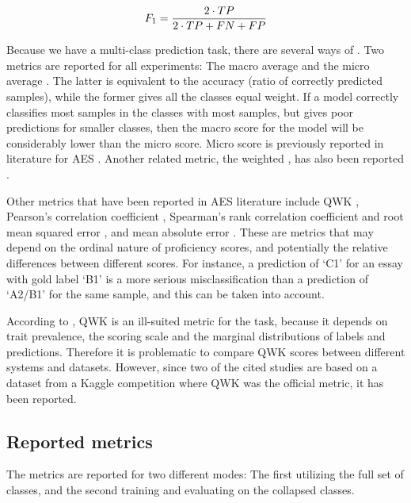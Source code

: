 \begin{equation}\label{eq:fi}
  F_1 = {{2\cdot TP}\over{2\cdot TP + FN + FP}}
\end{equation}

Because we have a multi-class prediction task, there are several
ways of . Two metrics are
reported for all experiments: The macro average \FI and the micro average
\FI. The latter is equivalent to the accuracy (ratio of correctly predicted
samples), while the former gives all the classes equal weight. If a model
correctly classifies most samples in the classes with most samples, but gives
poor predictions for smaller classes, then the macro \FI score for the model
will be considerably lower than the micro \FI score. Micro \FI score is
previously reported in literature for \ac{AES} \autocite{vajjala17}. Another
related metric, the weighted \FI, has also been reported
\autocite{vajjala18universalCEFR}.

Other metrics that have been reported in \ac{AES} literature include \ac{QWK}
\autocite{taghipour16, alikaniotis2016automatic}, Pearson's correlation
coefficient \autocite{vajjala17, alikaniotis2016automatic}, Spearman's rank
correlation coefficient and root mean squared error
\autocite{alikaniotis2016automatic}, and mean absolute error
\autocite{vajjala17}. These are metrics that may depend on the ordinal nature
of proficiency scores, and potentially the relative differences between
different scores. For instance, a prediction of `C1' for an essay with gold
label `B1' is a more serious misclassification than a prediction of `A2/B1'
for the same sample, and this can be taken into account.

According to \textcite{yannakoudakis2015evaluating}, \ac{QWK} is an
ill-suited metric for the task, because it depends on trait prevalence, the
scoring scale and the marginal distributions of labels and predictions.
Therefore it is problematic to compare \ac{QWK} scores between different
systems and datasets. However, since two of the cited studies are based on
a dataset from a Kaggle competition where \ac{QWK} was the official metric,
it has been reported.


\subsection{Reported metrics}

The metrics are reported for two different modes: The first utilizing the
full set of classes, and the second training and evaluating on the collapsed
classes.

